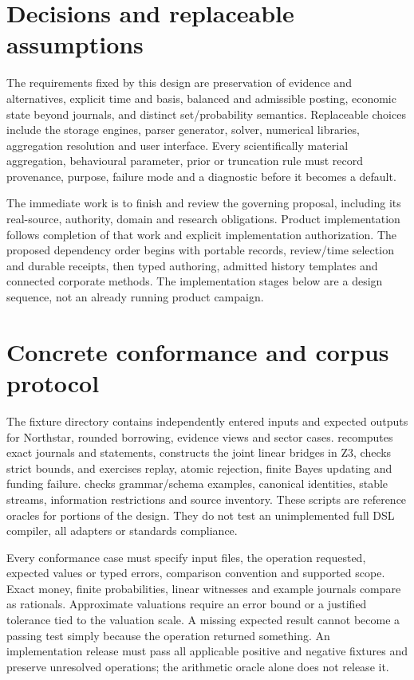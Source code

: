 \section{Decisions and replaceable assumptions}

The requirements fixed by this design are preservation of evidence and
alternatives, explicit time and basis, balanced and admissible posting, economic
state beyond journals, and distinct set/probability semantics. Replaceable
choices include the storage engines, parser generator, solver, numerical
libraries, aggregation resolution and user interface. Every scientifically
material aggregation, behavioural parameter, prior or truncation rule must
record provenance, purpose, failure mode and a diagnostic before it becomes a
default.

The immediate work is to finish and review the governing proposal, including
its real-source, authority, domain and research obligations. Product
implementation follows completion of that work and explicit implementation
authorization. The proposed dependency order begins with portable records,
review/time selection and durable receipts, then typed authoring, admitted
history templates and connected corporate methods. The implementation stages
below are a design sequence, not an already running product campaign.

\section{Concrete conformance and corpus protocol}

The fixture directory contains independently entered inputs and expected
outputs for Northstar, rounded borrowing, evidence views and sector cases.
 recomputes exact journals and statements,
constructs the joint linear bridges in Z3, checks strict bounds, and exercises
replay, atomic rejection, finite Bayes updating and funding failure.
 checks grammar/schema examples, canonical
identities, stable streams, information restrictions and source inventory.
These scripts are reference oracles for portions of the design. They do not
test an unimplemented full DSL compiler, all adapters or standards compliance.

Every conformance case must specify input files, the operation requested,
expected values or typed errors, comparison convention and supported scope.
Exact money, finite probabilities, linear witnesses and example journals
compare as rationals. Approximate valuations require an error bound or a
justified tolerance tied to the valuation scale. A missing expected result
cannot become a passing test simply because the operation returned something.
An implementation release must pass all applicable positive and negative
fixtures and preserve unresolved operations; the arithmetic oracle alone
does not release it.

